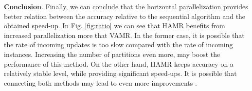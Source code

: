 \documentclass[journal]{IEEEtran}
\begin{document}
\begin{table}[h]
	\captionsetup{name=Tab}
	\caption{Computing time [s] for SAMR and \textbf{speed-up} when running HAMR with different numbers of partitions P.}
	\centering
	\label{tab:time_horizontal}
\end{table}

\medskip
\noindent\textbf{Conclusion}. Finally, we can conclude that the horizontal parallelization provides better relation between the accuracy relative to the sequential algorithm and the obtained speed-up. In Fig. \ref{fig:ratio} we can see that HAMR benefits from increased parallelization more that VAMR. In the former case, it is possible that the rate of incoming updates is too slow compared with the rate of incoming instances. Increasing the number of partitions even more, may boost the performance of this method. On the other hand, HAMR keeps accuracy on a relatively stable level, while providing significant speed-ups. It is possible that connecting both methods may lead to even more improvements \cite{Vu:2014}. 
\end{document}
